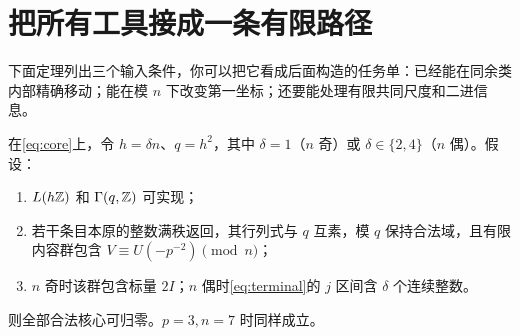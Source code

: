 \section{把所有工具接成一条有限路径}
下面定理列出三个输入条件，你可以把它看成后面构造的任务单：已经能在同余类内部精确移动；能在模 $n$ 下改变第一坐标；还要能处理有限共同尺度和二进信息。
\begin{theorem}[三块核心的共同终端定理]\label{thm:terminal}
在\eqref{eq:core}上，令 $h=\delta n$、$q=h^2$，其中 $\delta=1$（$n$ 奇）或 $\delta\in\{2,4\}$（$n$ 偶）。假设：
\begin{enumerate}
\item $L(h\mathbb Z)$ 和 $\Gamma(q,\mathbb Z)$ 可实现；
\item 若干条目本原的整数满秩返回，其行列式与 $q$ 互素，模 $q$ 保持合法域，且有限内容群包含 $V\equiv U(-p^{-2})\pmod n$；
\item $n$ 奇时该群包含标量 $2I$；$n$ 偶时\eqref{eq:terminal}的 $j$ 区间含 $\delta$ 个连续整数。
\end{enumerate}
则全部合法核心可归零。$p=3,n=7$ 时同样成立。
\end{theorem}
